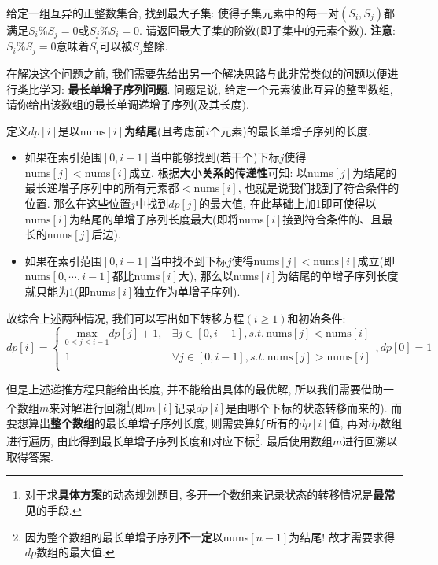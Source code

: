 \documentclass{article}
\begin{document}
\begin{homeworkProblem}
	给定一组互异的正整数集合, 找到最大子集: 使得子集元素中的每一对$(S_i,S_j)$都满足$S_i\%S_j=0$或$S_j\% S_i=0$. 请返回最大子集的阶数(即子集中的元素个数). \textbf{注意}: $S_i\%S_j=0$意味着$S_i$可以被$S_j$整除.

	\solution 在解决这个问题之前, 我们需要先给出另一个解决思路与此非常类似的问题以便进行类比学习: \textbf{最长单增子序列问题}. 问题是说, 给定一个元素彼此互异的整型数组, 请你给出该数组的最长单调递增子序列(及其长度). 
    
    定义$dp[i]$是以$\text{nums}[i]$\textbf{为结尾}(且考虑前$i$个元素)的最长单增子序列的长度. 
    \begin{itemize}
        \item 如果在索引范围$[0,i-1]$当中能够找到(若干个)下标$j$使得$\text{nums}[j]<\text{nums}[i]$成立. 根据\textbf{大小关系的传递性}可知: 以$\text{nums}[j]$为结尾的最长递增子序列中的所有元素都$<\text{nums}[i]$, 也就是说我们找到了符合条件的位置. 那么在这些位置$j$中找到$dp[j]$的最大值, 在此基础上加1即可使得以$\text{nums}[i]$为结尾的单增子序列长度最大(即将nums$[i]$接到符合条件的、且最长的nums$[j]$后边).
        \item 如果在索引范围$[0,i-1]$当中找不到下标$j$使得$\text{nums}[j]<\text{nums}[i]$成立(即$\text{nums}[0,\cdots,i-1]$都比$\text{nums}[i]$大), 那么以nums$[i]$为结尾的单增子序列长度就只能为1(即nums$[i]$独立作为单增子序列).
    \end{itemize}

    故综合上述两种情况, 我们可以写出如下转移方程$(i\geq 1)$和初始条件:
    $$
    dp\left[ i \right] =\left\{ \begin{matrix}
        \underset{0\le j\le i-1}{\text{max}}dp\left[ j \right] +1,&		\exists j\in \left[ 0,i-1 \right] , s.t. \,\text{nums}\left[ j \right] <\text{nums}\left[ i \right]\\
        1&		\forall j\in \left[ 0,i-1 \right] , s.t. \,\text{nums}\left[ j \right] >\text{nums}\left[ i \right]\\
    \end{matrix} \right. , dp\left[ 0 \right] =1
    $$

    但是上述递推方程只能给出长度, 并不能给出具体的最优解, 所以我们需要借助一个数组$m$来对解进行回溯\footnote{对于求\textbf{具体方案}的动态规划题目, 多开一个数组来记录状态的转移情况是\textbf{最常见}的手段.}(即$m[i]$记录$dp[i]$是由哪个下标的状态转移而来的). 而要想算出\textbf{整个数组}的最长单增子序列长度, 则需要算好所有的$dp[i]$值, 再对$dp$数组进行遍历, 由此得到最长单增子序列长度和对应下标\footnote{因为整个数组的最长单增子序列\textbf{不一定}以nums$[n-1]$为结尾! 故才需要求得$dp$数组的最大值.}. 最后使用数组$m$进行回溯以取得答案.


\end{homeworkProblem}
\end{document}
